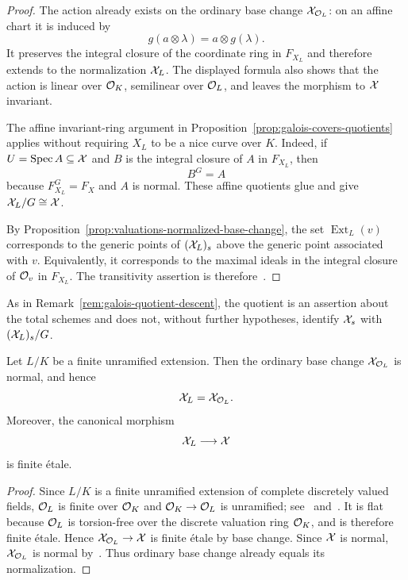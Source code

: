 \begin{proof}
    The action already exists on the ordinary base change $\mathcal X_{\mathcal O_L}$: on an affine chart it is induced by
    \[
        g(a\otimes\lambda)=a\otimes g(\lambda).
    \]
    It preserves the integral closure of the coordinate ring in $F_{X_L}$ and therefore extends to the normalization $\mathcal X_L$.
    The displayed formula also shows that the action is linear over $\mathcal O_K$, semilinear over $\mathcal O_L$, and leaves the morphism to $\mathcal X$ invariant.

    The affine invariant-ring argument in Proposition~\ref{prop:galois-covers-quotients} applies without requiring $X_L$ to be a nice curve over $K$.
    Indeed, if $U=\operatorname{Spec} A\subseteq\mathcal X$ and $B$ is the integral closure of $A$ in $F_{X_L}$, then
    \[
        B^G=A
    \]
    because $F_{X_L}^G=F_X$ and $A$ is normal.
    These affine quotients glue and give $\mathcal X_L/G\cong\mathcal X$.

    By Proposition~\ref{prop:valuations-normalized-base-change}, the set $\operatorname{Ext}_L(v)$ corresponds to the generic points of $(\mathcal X_L)_s$ above the generic point associated with $v$.
    Equivalently, it corresponds to the maximal ideals in the integral closure of $\mathcal{O}_v$ in $F_{X_L}$.
    The transitivity assertion is therefore~\cite[\href{https://stacks.math.columbia.edu/tag/09EA}{Lemma 15.114.1}]{Stacks}.
\end{proof}

As in Remark~\ref{rem:galois-quotient-descent}, the quotient is an assertion about the total schemes and does not, without further hypotheses, identify $\mathcal X_s$ with $(\mathcal X_L)_s/G$.

\begin{proposition}\label{prop:unramified-base-change}
    Let $L/K$ be a finite unramified extension.
    Then the ordinary base change $\mathcal X_{\mathcal O_L}$ is normal, and hence
    \[
        \mathcal X_L=\mathcal X_{\mathcal O_L}.
    \]
    Moreover, the canonical morphism
    \[
        \mathcal X_L\longrightarrow\mathcal X
    \]
    is finite étale.
\end{proposition}

\begin{proof}
    Since $L/K$ is a finite unramified extension of complete discretely valued fields, $\mathcal O_L$ is finite over $\mathcal O_K$ and $\mathcal O_K\to\mathcal O_L$ is unramified; see~\cite[\href{https://stacks.math.columbia.edu/tag/0EXQ}{Remark 15.113.6 and Definition 15.113.7}]{Stacks} and~\cite[\href{https://stacks.math.columbia.edu/tag/024L}{Lemma 41.3.3}]{Stacks}.
    It is flat because $\mathcal O_L$ is torsion-free over the discrete valuation ring $\mathcal O_K$, and is therefore finite étale.
    Hence $\mathcal X_{\mathcal O_L}\to\mathcal X$ is finite étale by base change.
    Since $\mathcal X$ is normal, $\mathcal X_{\mathcal O_L}$ is normal by~\cite[\href{https://stacks.math.columbia.edu/tag/025P}{Proposition 41.19.7}]{Stacks}.
    Thus ordinary base change already equals its normalization.
\end{proof}

